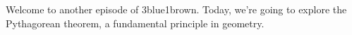 \documentclass[preview]{standalone}
\begin{document}
\begin{center}
Welcome to another episode of 3blue1brown. Today, we're going to explore the Pythagorean theorem, a fundamental principle in geometry.
\end{center}
\end{document}

